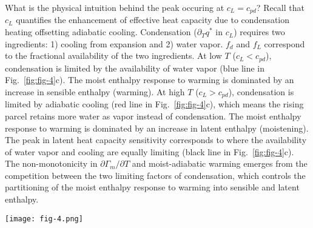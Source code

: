 \documentclass[draft]{ametsocV6.1}
\begin{document}
What is the physical intuition behind the peak occuring at $c_L = c_{pd}$? Recall that $c_L$ quantifies the enhancement of effective heat capacity due to condensation heating offsetting adiabatic cooling. Condensation ($\partial_T q^*$ in $c_L$) requires two ingredients: 1) cooling from expansion and 2) water vapor. $f_d$ and $f_L$ correspond to the fractional availability of the two ingredients. At low $T$ ($c_L < c_{pd}$), condensation is limited by the availability of water vapor (blue line in Fig.~\ref{fig:fig-4}c). The moist enthalpy response to warming is dominated by an increase in sensible enthalpy (warming). At high $T$ ($c_L > c_{pd}$), condensation is limited by adiabatic cooling (red line in Fig.~\ref{fig:fig-4}c), which means the rising parcel retains more water as vapor instead of condensation. The moist enthalpy response to warming is dominated by an increase in latent enthalpy (moistening). The peak in latent heat capacity sensitivity corresponds to where the availability of water vapor and cooling are equally limiting (black line in Fig.~\ref{fig:fig-4}c). The non-monotonicity in $\partial\Gamma_m/\partial T$ and moist-adiabatic warming emerges from the competition between the two limiting factors of condensation, which controls the partitioning of the moist enthalpy response to warming into sensible and latent enthalpy.

\begin{figure*}[htbp]
 \centering
 \texttt{[image: fig-4.png]}\\
 \caption{The latent heat capacity sensitivity is decomposed into a product of four terms (Eq.~\ref{eq:term_b_intermediate}) that vary monotonically with local temperature $T$, where local means at pressure $p$. (a) The latent volume ratio $\tilde{\alpha}$ increases exponentially with $T$ (dashed) while the fractional change in latent heat capacity $c_L$ to a fractional change in $T$ decreases approximately linearly with $T$ (dotted). The product of the two is weakly non-monotonic with $T$ where the product has a local minimum (dash-dot). (b) The local minimum across the pressure-surface temperature space approximately occurs where $\tilde{\alpha}= R_v T / L_v$ (white line). (c) The latent fraction of effective heat capacity $f_L$ increases logistically with $T$ (blue line) while the sensible fraction $f_d$ decreases logistically with $T$ (red line). The product of the two is non-monotonic with $T$ where the product has a local maximum (purple line). (d) The $f_d\cdot f_L$ local maximum across the pressure-surface temperature space occurs where $c_L=c_{pd}$ (black line).}\label{fig:fig-4}
\end{figure*}
\end{document}

